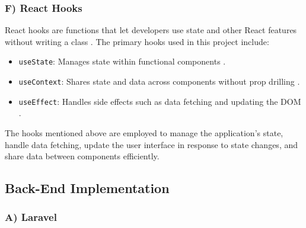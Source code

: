 \newpage

\subsubsection*{F) React Hooks}

React hooks are functions that let developers use state and other React features without writing a class \cite{react-hooks-intro} \cite{react-hooks-reference}. The primary hooks used in this project include:

\begin{itemize}
    \item \texttt{useState}: Manages state within functional components \cite{react-hooks-state}.
    \item \texttt{useContext}: Shares state and data across components without prop drilling \cite{react-usecontext}.
    \item \texttt{useEffect}: Handles side effects such as data fetching and updating the DOM \cite{react-hooks-effect}.

\end{itemize}

The hooks mentioned above are employed to manage the application's state, handle data fetching, update the user interface in response to state changes, and share data between components efficiently.


\subsection{Back-End Implementation}
\subsubsection*{A) Laravel}


